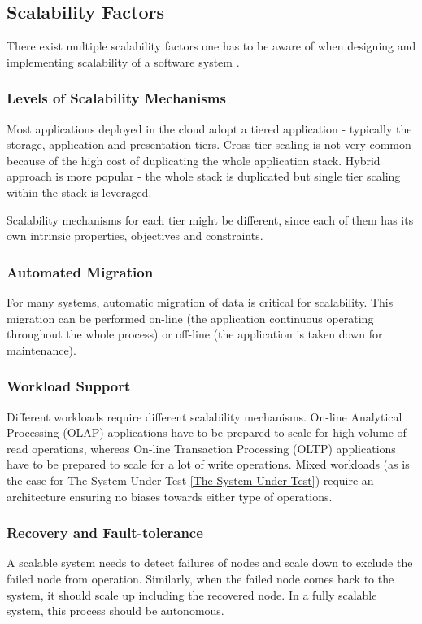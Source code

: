 \documentclass{uvamscse}
\begin{document}
\subsection{Scalability Factors}
There exist multiple scalability factors one has to be aware of when designing and implementing scalability of a software system \cite{WeiTek}.

\subsubsection{Levels of Scalability Mechanisms}
Most applications deployed in the cloud adopt a tiered application - typically the storage, application and presentation tiers. Cross-tier scaling is not very common because of the high cost of duplicating the whole application stack. Hybrid approach is more popular - the whole stack is duplicated but single tier scaling within the stack is leveraged.

Scalability mechanisms for each tier might be different, since each of them has its own intrinsic properties, objectives and constraints.

\subsubsection{Automated Migration}
For many systems, automatic migration of data is critical for scalability. This migration can be performed on-line (the application continuous operating throughout the whole process) or off-line (the application is taken down for maintenance).

\subsubsection{Workload Support}
Different workloads require different scalability mechanisms. On-line Analytical Processing (OLAP) applications have to be prepared to scale for high volume of read operations, whereas On-line Transaction Processing (OLTP) applications have to be prepared to scale for a lot of write operations. Mixed workloads (as is the case for The System Under Test \ref{The System Under Test}) require an architecture ensuring no biases towards either type of operations.

\subsubsection{Recovery and Fault-tolerance}
A scalable system needs to detect failures of nodes and scale down to exclude the failed node from operation. Similarly, when the failed node comes back to the system, it should scale up including the recovered node. In a fully scalable system, this process should be autonomous.
\end{document}
